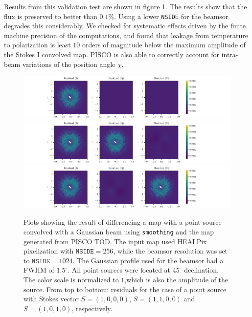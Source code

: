 \documentclass[a4paper,11pt]{article}
\begin{document}
Results from this validation test are shown in figure \ref{fig::stokesqsource256beam1024dec45}. The results show that the flux is preserved to better than $0.1\%$. Using a lower \texttt{NSIDE} for the beamsor degrades this considerably. We checked for systematic effects driven by the finite machine precision of the computations, and found that leakage from temperature to polarization is least $10$ orders of magnitude below the maximum amplitude of the Stokes I convolved map. PISCO is also able to correctly account for intra-beam variations of the position angle $\chi$.

\begin{figure}
	\centering
	\includegraphics[width=1.0\linewidth]{figures/stokes_I_source_256_beam_1024_dec_45.pdf}
	\includegraphics[width=1.0\linewidth]{figures/stokes_Q_source_256_beam_1024_dec_45.pdf}
	\includegraphics[width=1.0\linewidth]{figures/stokes_U_source_256_beam_1024_dec_45.pdf}
	\caption{Plots showing the result of differencing a map with a point source convolved with a Gaussian beam using \texttt{smoothing} and the map generated from PISCO TOD. The input map used HEALPix pixelization with $\mathrm{\texttt{NSIDE}} = 256$, while the beamsor resolution was set to $\mathrm{\texttt{NSIDE}} = 1024$. The Gaussian profile used for the beamsor had a FWHM of $1.5^\circ$. All point sources were located at $45^\circ$ declination. The color scale is normalized to $1$,which is also the amplitude of the source. From top to bottom: residuals for the case of a point source with Stokes vector $S = (1,0,0,0)$, $S=(1,1,0,0)$ and $S=(1,0,1,0)$, respectively.}
	\label{fig::stokesqsource256beam1024dec45}
\end{figure}
\end{document}
